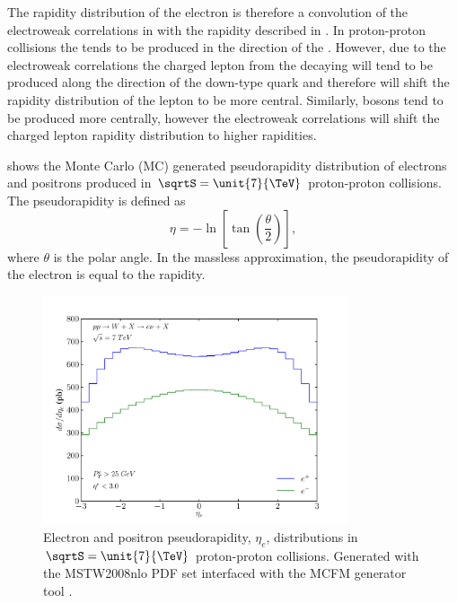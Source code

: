 The rapidity distribution of the electron is therefore a convolution of the
{electroweak} correlations in  with the \PW rapidity
described in .  In proton-proton collisions the \PWp
tends to be produced in the direction of the \Pup.  However, due to the
electroweak correlations the charged lepton from the decaying \PWp will tend to
be produced along the direction of the down-type quark and therefore will shift
the rapidity distribution of the lepton to be more central. Similarly, \PWm
bosons tend to be produced more centrally, however the electroweak correlations
will shift the charged lepton rapidity distribution to higher rapidities.

 shows the Monte Carlo (MC) generated
pseudorapidity distribution of electrons and positrons produced in
$\sqrtS=\unit{7}{\TeV}$ proton-proton collisions.  
The pseudorapidity is defined as 
\begin{equation}
    \eta = -\ln\left[\tan\left(\frac{\theta}{2}\right)\right], 
\end{equation}
where $\theta$ is the polar angle.  In the massless approximation, the
pseudorapidity of the electron is equal to the rapidity.

\begin{figure}[htbp]
  \centering
  \includegraphics[width=0.8\textwidth]{lepton-rapidity}
  \caption[Electron and positron pseudorapidity, $\eta_e$, distributions in
$\sqrtS=\unit{7}{\TeV}$ proton-proton collisions.] {Electron and positron
pseudorapidity, $\eta_e$, distributions in $\sqrtS=\unit{7}{\TeV}$ proton-proton
collisions. Generated with the MSTW2008nlo PDF set\cite{martin2009parton}
interfaced with the MCFM generator tool \cite{campbellmcfm}.}
  \label{fig:leptonrapidity}
\end{figure}

